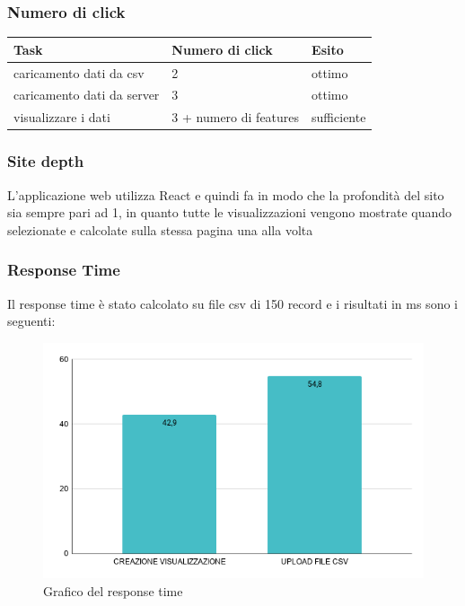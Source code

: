 \subsubsection{Numero di click}

\begin{longtabu} to \textwidth {| X[0.2,c m] | X[0.1,c m]| X[0.1,c m]| }
    \hline
    \textbf{Task} &
    \textbf{Numero di click} &
    \textbf{Esito}\\
    \hline
    caricamento dati da csv & 2 & ottimo \\ 
    \hline
    caricamento dati da server & 3 & ottimo \\
    \hline
    visualizzare i dati & 3 + numero di features & sufficiente \\
    \hline 
    \end{longtabu}


\subsubsection{Site depth}
    L'applicazione web utilizza React e quindi fa in modo che la profondità del sito sia sempre pari ad 1, in quanto tutte le visualizzazioni vengono mostrate quando selezionate e calcolate sulla stessa pagina una alla volta

    
\subsubsection{Response Time}
    Il response time è stato calcolato su file csv di 150 record e i risultati in ms sono i seguenti:

    \begin{figure}[H]
        \centering
        \includegraphics[width=10 cm]{source/sections/images/response-time.png}
        \caption{Grafico del response time}
    \end{figure}
    
